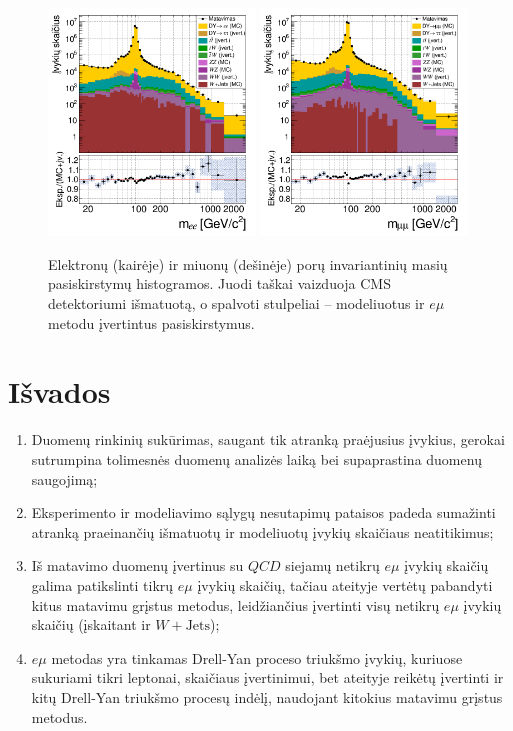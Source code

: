 \documentclass[a4paper, 12pt, twoside]{article}
\newcommand{\emu}{e\mu}
\begin{document}
\begin{figure}[H]
	\includegraphics[width=0.49\textwidth]{ee_mass_est.png}
	\includegraphics[width=0.49\textwidth]{mumu_mass_est.png}
	\caption{\label{fig:MassDataMCest}
		Elektronų (kairėje) ir miuonų (dešinėje) porų invariantinių masių pasiskirstymų histogramos.
		Juodi taškai vaizduoja CMS detektoriumi išmatuotą, o spalvoti stulpeliai -- modeliuotus ir $\emu$ metodu įvertintus
		pasiskirstymus.}
\end{figure}


\section{Išvados}
\begin{enumerate}
	\item Duomenų rinkinių sukūrimas, saugant tik atranką praėjusius įvykius, gerokai sutrumpina tolimesnės duomenų analizės
	laiką bei supaprastina duomenų saugojimą;
	\item Eksperimento ir modeliavimo sąlygų nesutapimų pataisos padeda sumažinti atranką praeinančių išmatuotų ir modeliuotų
	įvykių skaičiaus neatitikimus;
	\item Iš matavimo duomenų įvertinus su $QCD$ siejamų netikrų $\emu$ įvykių skaičių galima patikslinti tikrų $\emu$ įvykių
	skaičių, tačiau ateityje vertėtų pabandyti kitus matavimu grįstus metodus, leidžiančius įvertinti visų netikrų $\emu$
	įvykių skaičių (įskaitant ir $W+\mathrm{Jets}$);
	\item $\emu$ metodas yra tinkamas Drell-Yan proceso triukšmo įvykių, kuriuose sukuriami tikri leptonai, skaičiaus įvertinimui,
	bet ateityje reikėtų įvertinti ir kitų Drell-Yan triukšmo procesų indėlį, naudojant kitokius matavimu grįstus metodus.
\end{enumerate}
\end{document}
